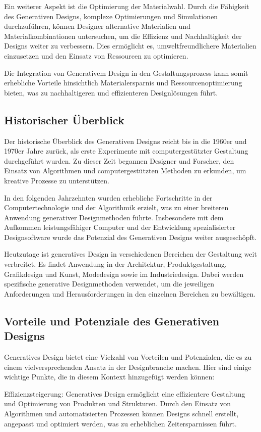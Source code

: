 Ein weiterer Aspekt ist die Optimierung der Materialwahl. Durch die Fähigkeit des Generativen Designs, komplexe Optimierungen und Simulationen durchzuführen, können Designer alternative Materialien und Materialkombinationen untersuchen, um die Effizienz und Nachhaltigkeit der Designs weiter zu verbessern. Dies ermöglicht es, umweltfreundlichere Materialien einzusetzen und den Einsatz von Ressourcen zu optimieren.

Die Integration von Generativem Design in den Gestaltungsprozess kann somit erhebliche Vorteile hinsichtlich Materialersparnis und Ressourcenoptimierung bieten, was zu nachhaltigeren und effizienteren Designlösungen führt.

\subsection*{Historischer Überblick}
Der historische Überblick des Generativen Designs reicht bis in die 1960er und 1970er Jahre zurück, als erste Experimente mit computergestützter Gestaltung durchgeführt wurden. Zu dieser Zeit begannen Designer und Forscher, den Einsatz von Algorithmen und computergestützten Methoden zu erkunden, um kreative Prozesse zu unterstützen.

In den folgenden Jahrzehnten wurden erhebliche Fortschritte in der Computertechnologie und der Algorithmik erzielt, was zu einer breiteren Anwendung generativer Designmethoden führte. Insbesondere mit dem Aufkommen leistungsfähiger Computer und der Entwicklung spezialisierter Designsoftware wurde das Potenzial des Generativen Designs weiter ausgeschöpft.

Heutzutage ist generatives Design in verschiedenen Bereichen der Gestaltung weit verbreitet. Es findet Anwendung in der Architektur, Produktgestaltung, Grafikdesign und Kunst, Modedesign sowie im Industriedesign. Dabei werden spezifische generative Designmethoden verwendet, um die jeweiligen Anforderungen und Herausforderungen in den einzelnen Bereichen zu bewältigen.

\subsection*{Vorteile und Potenziale des Generativen Designs}
Generatives Design bietet eine Vielzahl von Vorteilen und Potenzialen, die es zu einem vielversprechenden Ansatz in der Designbranche machen. Hier sind einige wichtige Punkte, die in diesem Kontext hinzugefügt werden können:

Effizienzsteigerung: Generatives Design ermöglicht eine effizientere Gestaltung und Optimierung von Produkten und Strukturen. Durch den Einsatz von Algorithmen und automatisierten Prozessen können Designs schnell erstellt, angepasst und optimiert werden, was zu erheblichen Zeitersparnissen führt.

